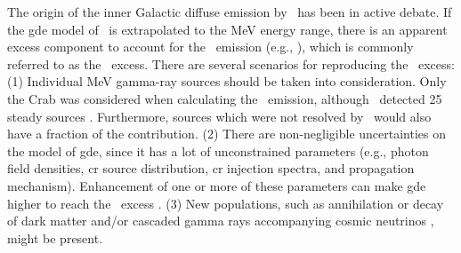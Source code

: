 \documentclass[a4paper,11pt]{article}
\begin{document}
The origin of the inner Galactic diffuse emission by \comptel\ has been in active debate. 
If the \ac{gde} model of \lat\ is extrapolated to the MeV energy range, 
there is an apparent excess component to account for the \comptel\ emission (e.g., \citealt{strong_diffuse_2004}), which is commonly referred to as the \comptel\ excess.
There are several scenarios for reproducing the \comptel\ excess:
(1) Individual MeV gamma-ray sources should be taken into consideration. 
Only the Crab was considered when calculating the \comptel\ emission, although \comptel\ detected 25 steady sources \citep{Schonfelder2000}.
Furthermore, sources which were not resolved by \comptel\ would also have a fraction of the contribution. %
(2) There are non-negligible %
uncertainties on the model of \ac{gde}, since it has a lot of unconstrained parameters (e.g., photon field densities, \ac{cr} source distribution, \ac{cr} injection spectra, and propagation mechanism).
Enhancement of one or more of these parameters can make \ac{gde} higher to reach the \comptel\ excess \citep{bouchet_diffuse_2011}.
(3) New populations, such as annihilation or decay of dark matter \citep{boddy_indirect_2015,christy_indirect_2022,Binder_2022} and/or cascaded gamma rays accompanying cosmic neutrinos \citep{fang_tev_2022}, might be present.
\end{document}
